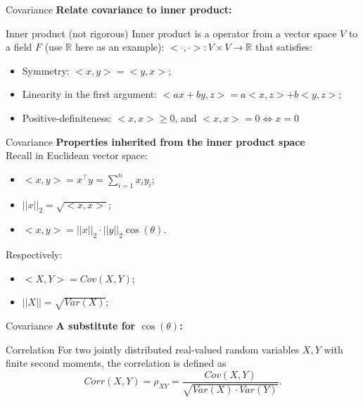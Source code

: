 \documentclass [aspectratio=169]{beamer}
\begin{document}
\begin{frame}{Covariance}
    \textbf{Relate covariance to inner product:}\\
\begin{block}{Inner product (not rigorous)}
Inner product is a operator from a vector space $V$ to a field $F$ (use $\mathbb{R}$ here as an example): $<\cdot, \cdot>: V \times V \to \mathbb{R}$ that satisfies:
\begin{itemize}
    \item Symmetry: $<x, y> = <y, x>$;
    \item Linearity in the first argument: $<ax + by, z> = a<x, z> + b<y, z>$;
    \item Positive-definiteness: $<x,x>\ge 0$, and $<x, x> = 0 \Leftrightarrow x = 0$
\end{itemize}
\end{block}
\vspace{0.1in}
\end{frame}


\begin{frame}{Covariance}
\textbf{Properties inherited from the inner product space}\\
\vspace{0.1in}
Recall in Euclidean vector space:
\begin{itemize}
    \item  $<x, y> = x^\top y = \sum_{i = 1}^n x_iy_i$;
    \item $||x||_2 = \sqrt{<x,x>}$;
    \item $<x,y> = ||x||_2\cdot ||y||_2 \cos(\theta)$.
\end{itemize}
\vspace{0.1in}
Respectively:
\begin{itemize}
    \item  $<X, Y> = Cov(X, Y)$;
    \item $||X|| = \sqrt{Var(X)}$;
\end{itemize}
\end{frame}

\begin{frame}{Covariance}
\textbf{A substitute for $\cos(\theta)$:}
     \begin{block}{Correlation}
    For two jointly distributed real-valued random variables $X, Y$ with finite second moments, the correlation is defined as
    $$
    Corr(X, Y) = \rho_{XY} = \frac{Cov(X, Y)}{\sqrt{Var(X)\cdot Var(Y)}}.
    $$
    \end{block}
    \vspace{0.1in}
\end{frame}
\end{document}
